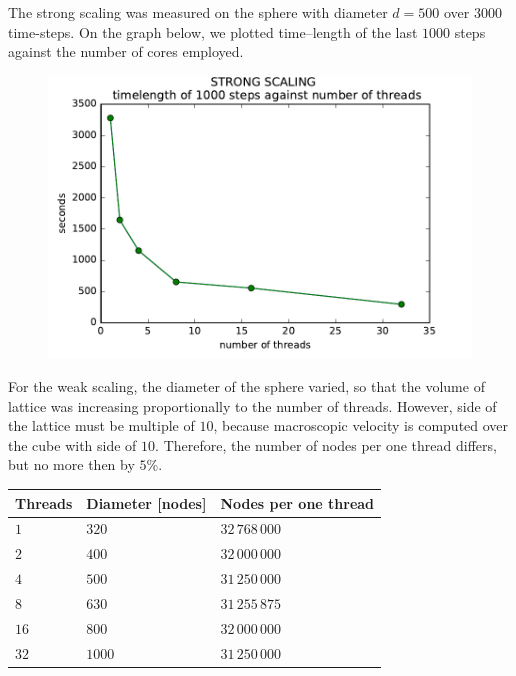 The strong scaling was measured on the sphere with diameter $d = 500$ over $3000$ time-steps.
On the graph below, we plotted time--length of the last $1000$ steps against the number of cores employed.
\begin{figure}[H]
 \centering 
 \includegraphics[width=1\textwidth]{./img/strongscalingg}
\end{figure}

For the weak scaling, the diameter of the sphere varied, so that the volume of lattice was increasing proportionally to the number of threads. However, side of the lattice must be multiple of $10$, because macroscopic velocity is computed over the cube with side of $10$. Therefore, the number of nodes per one thread differs, but no more then by $5\%$.

\begin{tabular}{ |p{2cm}|p{4cm}|p{4cm}| }
 \hline
 Threads & Diameter [nodes] & Nodes per one thread \\
 \hline
 \hline
$1$ & $320$ & $32\,768\,000$ \\
 \hline
$2$ & $400$ & $32\,000\,000$\\
 \hline
$4$ & $500$ & $31\,250\,000$ \\
 \hline
$8$ & $630$ & $31\,255\,875$\\
 \hline
$16$ & $800$ & $32\,000\,000$ \\
 \hline
$32$ & $1000$ & $31\,250\,000$ \\
 \hline
 \end{tabular}


